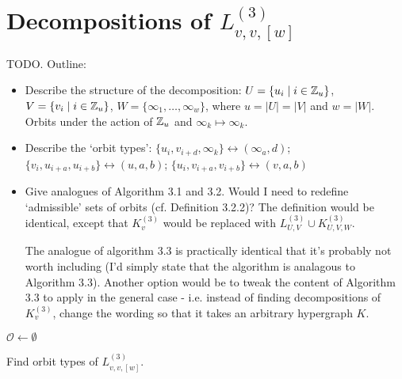 \section{Decompositions of $L_{v,v,[w]}^{(3)}$}
\label{sec:methods/candelabra}

TODO. Outline:

\begin{itemize}
    \item Describe the structure of the decomposition: $U = \{u_i \mid i \in \mathbb{Z}_u\}$, $V = \{v_i \mid i \in \mathbb{Z}_u\}$, $W = \{\infty_1, \ldots, \infty_w\}$, where $u = |U| = |V|$ and $w = |W|$. Orbits under the action of $\mathbb{Z}_u$ and $\infty_k \mapsto \infty_k$.
    \item Describe the `orbit types': $\{u_i, v_{i+d}, \infty_k\} \leftrightarrow (\infty_a, d)$; $\{v_i, u_{i+a}, u_{i+b}\} \leftrightarrow (u, a, b)$; $\{u_i, v_{i+a}, v_{i+b}\} \leftrightarrow (v, a, b)$
    \item Give analogues of Algorithm 3.1 and 3.2. Would I need to redefine `admissible' sets of orbits (cf. Definition 3.2.2)? The definition would be identical, except that $K_{v}^{(3)}$ would be replaced with $L_{U,V}^{(3)} \cup K_{U,V,W}^{(3)}$.

    The analogue of algorithm 3.3 is practically identical that it's probably not worth including (I'd simply state that the algorithm is analagous to Algorithm 3.3). Another option would be to tweak the content of Algorithm 3.3 to apply in the general case - i.e. instead of finding decompositions of $K_{v}^{(3)}$, change the wording so that it takes an arbitrary hypergraph $K$.
\end{itemize}

\begin{algorithm}

$\mathcal{O} \gets \emptyset$\;



\;

\caption{Find orbit types of $L_{v,v,[w]}^{(3)}$.} \label{alg:get-candelabra-types}
\end{algorithm}

